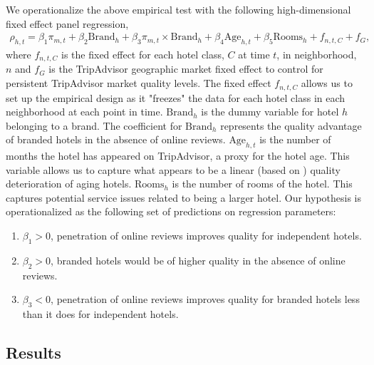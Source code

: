 \documentclass[12pt, leqno]{article}
\begin{document}
We operationalize the above empirical test with the following high-dimensional fixed effect panel regression,
\begin{equation}\label{eq:nbhd_brand}
\begin{split}
\rho_{h,t}=\beta_{1} \pi_{m,t} + \beta_{2} \text{Brand}_{h} + \beta_{3} \pi_{m,t}\times \text{Brand}_{h} + \beta_{4}\text{Age}_{h,t} + \beta_{5} \text{Rooms}_{h} + f_{n,t,C}+f_{G},
\end{split}
\end{equation}
where $f_{n,t,C}$ is the fixed effect for each hotel class, $C$ at time $t$, in neighborhood, $n$ and $f_{G}$ is the TripAdvisor geographic market fixed effect to control for persistent TripAdvisor market quality levels. The fixed effect $f_{n,t,C}$ allows us to set up the empirical design as it "freezes" the data for each hotel class in each neighborhood at each point in time. $\text{Brand}_h$ is the dummy variable for hotel $h$ belonging to a brand. The coefficient for $\text{Brand}_h$ represents the quality advantage of branded hotels in the absence of online reviews. $\text{Age}_{h,t}$ is the number of months the hotel has appeared on TripAdvisor, a proxy for the hotel age. This variable allows us to capture what appears to be a linear (based on ) quality deterioration of aging hotels.  $\text{Rooms}_{h}$ is the number of rooms of the hotel. This captures potential service issues related to being a larger hotel. Our hypothesis is operationalized as the following set of predictions on regression parameters:
\begin{enumerate}
\item $\beta_1>0$, penetration of online reviews improves quality for independent hotels.
\item $\beta_2>0$, branded hotels would be of higher quality in the absence of online reviews.
\item $\beta_3<0$, penetration of online reviews improves quality for branded hotels less than it does for independent hotels.
\end{enumerate}

\subsection{Results}
\end{document}
